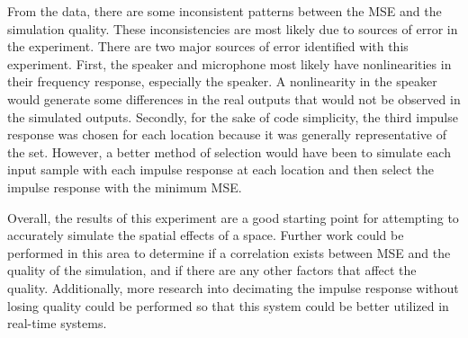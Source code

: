 \documentclass[letterpaper, 11pt, onecolumn, oneside]{article}
\begin{document}
From the data, there are some inconsistent patterns between the MSE and the simulation quality.
These inconsistencies are most likely due to sources of error in the experiment.
There are two major sources of error identified with this experiment.
First, the speaker and microphone most likely have nonlinearities in their frequency response, especially the speaker.
A nonlinearity in the speaker would generate some differences in the real outputs that would not be observed in the simulated outputs.
Secondly, for the sake of code simplicity, the third impulse response was chosen for each location because it was generally representative of the set.
However, a better method of selection would have been to simulate each input sample with each impulse response at each location and then select the impulse response with the minimum MSE.

Overall, the results of this experiment are a good starting point for attempting to accurately simulate the spatial effects of a space.
Further work could be performed in this area to determine if a correlation exists between MSE and the quality of the simulation, and if there are any other factors that affect the quality.
Additionally, more research into decimating the impulse response without losing quality could be performed so that this system could be better utilized in real-time systems.
\end{document}
